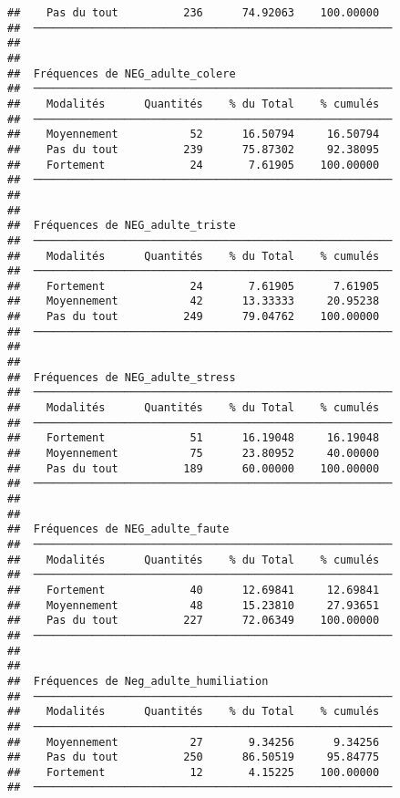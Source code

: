 \documentclass[
]{article}
\begin{document}
\begin{verbatim}
##    Pas du tout          236      74.92063    100.00000   
##  ─────────────────────────────────────────────────────── 
## 
## 
##  Fréquences de NEG_adulte_colere                         
##  ─────────────────────────────────────────────────────── 
##    Modalités      Quantités    % du Total    % cumulés   
##  ─────────────────────────────────────────────────────── 
##    Moyennement           52      16.50794     16.50794   
##    Pas du tout          239      75.87302     92.38095   
##    Fortement             24       7.61905    100.00000   
##  ─────────────────────────────────────────────────────── 
## 
## 
##  Fréquences de NEG_adulte_triste                         
##  ─────────────────────────────────────────────────────── 
##    Modalités      Quantités    % du Total    % cumulés   
##  ─────────────────────────────────────────────────────── 
##    Fortement             24       7.61905      7.61905   
##    Moyennement           42      13.33333     20.95238   
##    Pas du tout          249      79.04762    100.00000   
##  ─────────────────────────────────────────────────────── 
## 
## 
##  Fréquences de NEG_adulte_stress                         
##  ─────────────────────────────────────────────────────── 
##    Modalités      Quantités    % du Total    % cumulés   
##  ─────────────────────────────────────────────────────── 
##    Fortement             51      16.19048     16.19048   
##    Moyennement           75      23.80952     40.00000   
##    Pas du tout          189      60.00000    100.00000   
##  ─────────────────────────────────────────────────────── 
## 
## 
##  Fréquences de NEG_adulte_faute                          
##  ─────────────────────────────────────────────────────── 
##    Modalités      Quantités    % du Total    % cumulés   
##  ─────────────────────────────────────────────────────── 
##    Fortement             40      12.69841     12.69841   
##    Moyennement           48      15.23810     27.93651   
##    Pas du tout          227      72.06349    100.00000   
##  ─────────────────────────────────────────────────────── 
## 
## 
##  Fréquences de Neg_adulte_humiliation                    
##  ─────────────────────────────────────────────────────── 
##    Modalités      Quantités    % du Total    % cumulés   
##  ─────────────────────────────────────────────────────── 
##    Moyennement           27       9.34256      9.34256   
##    Pas du tout          250      86.50519     95.84775   
##    Fortement             12       4.15225    100.00000   
##  ───────────────────────────────────────────────────────
\end{verbatim}
\end{document}
